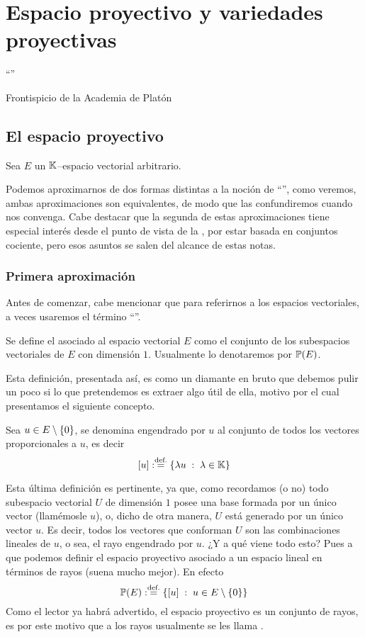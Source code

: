 \chapter{Espacio proyectivo y variedades proyectivas}
\label{epro}
\epigraph{``''}{Frontispicio de la Academia de Platón}
\section{El espacio proyectivo}
Sea $E$ un $\mathbb{K}$--espacio vectorial arbitrario.

Podemos aproximarnos de dos formas distintas a la noción de ``'', como veremos, ambas aproximaciones son equivalentes, de modo que las confundiremos cuando nos convenga. Cabe destacar que la segunda de estas aproximaciones tiene especial interés desde el punto de vista de la , por estar basada en conjuntos cociente, pero esos asuntos se salen del alcance de estas notas.
\subsection{Primera aproximación}
Antes de comenzar, cabe mencionar que para referirnos a los espacios vectoriales, a veces usaremos el término ``''.
\begin{defi}
	\label{epro_def_espacioProyectivo1}
	Se define el  asociado al espacio vectorial $E$ como el conjunto de los subespacios vectoriales de $E$ con dimensión $1$. Usualmente lo denotaremos por $\mathbb{P}(E)$.
\end{defi}
Esta definición, presentada así, es como un diamante en bruto que debemos pulir un poco si lo que pretendemos es extraer algo útil de ella, motivo por el cual presentamos el siguiente concepto.
\begin{defi}[Rayo]
	\label{epro_def_rayo}
	Sea $u\in E\setminus\{0\}$, se denomina  engendrado por $u$ al conjunto de todos los vectores proporcionales a $u$, es decir
	\begin{equation*}
		\left [ u \right ]:\stackrel{\textrm{def.}}{=}\{\lambda u\;:\; \lambda\in\mathbb{K}\}
	\end{equation*} 
\end{defi}
Esta última definición es pertinente, ya que, como recordamos (o no) todo subespacio vectorial $U$ de dimensión $1$ posee una base formada por un único vector (llamémosle $u$), o, dicho de otra manera, $U$ está generado por un único vector $u$. Es decir, todos los vectores que conforman $U$ son las combinaciones lineales de $u$, o sea, el rayo engendrado por $u$. ¿Y a qué viene todo esto? Pues a que podemos definir el espacio proyectivo asociado a un espacio lineal en términos de rayos (suena mucho mejor). En efecto
\begin{equation*}
	\mathbb{P}(E):\stackrel{\textrm{def.}}{=}\{\left [ u \right ]\;:\; u\in E\setminus\{0\}\}
\end{equation*}
Como el lector ya habrá advertido, el espacio proyectivo es un conjunto de rayos, es por este motivo que a los rayos usualmente se les llama .

